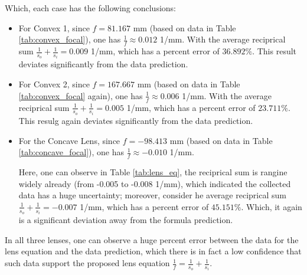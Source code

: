 \documentclass{article}
\begin{document}
Which, each case has the following conclusions:
\begin{itemize}
    \item For Convex 1, since $f=81.167$ mm (based on data in Table \ref{tab:convex_focal}), one has $\frac{1}{f}\approx 0.012$ 1/mm. With the average reciprical sum $\frac{1}{s_o}+\frac{1}{s_i} = 0.009$ 1/mm, which has a percent error of $36.892\%$. This result deviates significantly from the data prediction.
    
    \hfil

    \item For Convex 2, since $f=167.667$ mm (based on data in Table \ref{tab:convex_focal} again), one has $\frac{1}{f}\approx 0.006$ 1/mm. With the average reciprical sum $\frac{1}{s_o}+\frac{1}{s_i} = 0.005$ 1/mm, which has a percent error of $23.711\%$. This resulg again deviates significantly from the data prediction.
    
    \hfil

    \item For the Concave Lens, since $f=-98.413$ mm (based on data in Table \ref{tab:concave_focal}), one has $\frac{1}{f}\approx -0.010$ 1/mm. 
    
    Here, one can observe in Table \ref{tab:lens_eq}, the reciprical sum is rangine widely already (from -0.005 to -0.008 1/mm), which indicated the collected data has a huge uncertainty; moreover, consider he average reciprical sum $\frac{1}{s_o}+\frac{1}{s_i} = -0.007$ 1/mm, which has a percent error of $45.151\%$. Which, it again is a significant deviation away from the formula prediction.
\end{itemize}

In all three lenses, one can observe a huge percent error between the data for the lens equation and the data prediction, which there is in fact a low confidence that such data support the proposed lens equation $\frac{1}{f}=\frac{1}{s_o}+\frac{1}{s_i}$.

\newpage
\end{document}
